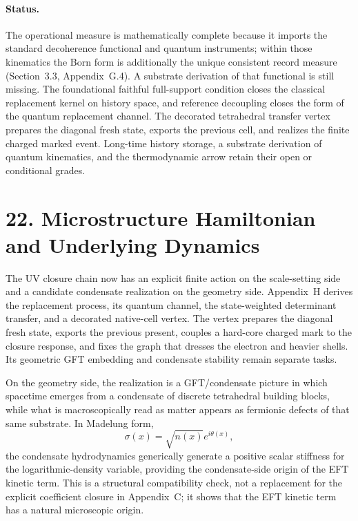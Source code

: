 \documentclass[11pt]{article}
\begin{document}
\paragraph{Status.}
The operational measure is mathematically complete because it imports the standard decoherence functional and quantum instruments; within those kinematics the Born form is additionally the unique consistent record measure (Section~3.3, Appendix~G.4). A substrate derivation of that functional is still missing. The foundational faithful full-support condition closes the classical replacement kernel on history space, and reference decoupling closes the form of the quantum replacement channel. The decorated tetrahedral transfer vertex prepares the diagonal fresh state, exports the previous cell, and realizes the finite charged marked event. Long-time history storage, a substrate derivation of quantum kinematics, and the thermodynamic arrow retain their open or conditional grades.

\section{22. Microstructure Hamiltonian and Underlying Dynamics}

The UV closure chain now has an explicit finite action on the scale-setting side and a candidate condensate realization on the geometry side. Appendix~H derives the replacement process, its quantum channel, the state-weighted determinant transfer, and a decorated native-cell vertex. The vertex prepares the diagonal fresh state, exports the previous present, couples a hard-core charged mark to the closure response, and fixes the graph that dresses the electron and heavier shells. Its geometric GFT embedding and condensate stability remain separate tasks.

On the geometry side, the realization is a GFT/condensate picture \citep{Oriti2016,Gielen2013} in which spacetime emerges from a condensate of discrete tetrahedral building blocks, while what is macroscopically read as matter appears as fermionic defects of that same substrate. In Madelung form,
\[
\sigma(x)=\sqrt{n(x)}e^{i\theta(x)},
\]
the condensate hydrodynamics generically generate a positive scalar stiffness for the logarithmic-density variable, providing the condensate-side origin of the EFT kinetic term. This is a structural compatibility check, not a replacement for the explicit coefficient closure in Appendix~C; it shows that the EFT kinetic term has a natural microscopic origin.
\end{document}
